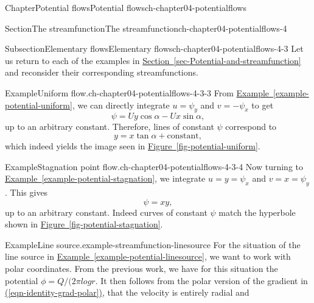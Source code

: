 \documentclass[oneside,10pt,]{book}
\newcommand{\xreffont}{\relax}
\numberwithin{equation}{section}
\begin{document}
\begin{chapterptx}{Chapter}{Potential flows}{}{Potential flows}{}{}{ch-chapter04-potentialflows}
\begin{sectionptx}{Section}{The streamfunction}{}{The streamfunction}{}{}{ch-chapter04-potentialflows-4}
%
%
\typeout{************************************************}
\typeout{************************************************}
%
\begin{subsectionptx}{Subsection}{Elementary flows}{}{Elementary flows}{}{}{ch-chapter04-potentialflows-4-3}
Let us return to each of the examples in \hyperref[sec-Potential-and-streamfunction]{Section~{\xreffont\ref{sec-Potential-and-streamfunction}}} and reconsider their corresponding streamfunctions.%
\begin{example}{Example}{Uniform flow.}{ch-chapter04-potentialflows-4-3-3}%
%
From \hyperref[example-potential-uniform]{Example~{\xreffont\ref{example-potential-uniform}}}, we can directly integrate \(u = \psi_y\) and \(v = -\psi_x\) to get%
\begin{equation*}
\psi = Uy\cos\alpha - Ux\sin\alpha, 
\end{equation*}
up to an arbitrary constant. Therefore, lines of constant \(\psi\) correspond to%
\begin{equation*}
y = x\tan\alpha + \textrm{constant},
\end{equation*}
which indeed yields the image seen in \hyperref[fig-potential-uniform]{Figure~{\xreffont\ref{fig-potential-uniform}}}.%
\end{example}
\begin{example}{Example}{Stagnation point flow.}{ch-chapter04-potentialflows-4-3-4}%
%
Now turning to \hyperref[example-potential-stagnation]{Example~{\xreffont\ref{example-potential-stagnation}}}, we integrate \(u = y = \psi_x\) and \(v = x = \psi_y\). This gives%
\begin{equation*}
\psi = xy, 
\end{equation*}
up to an arbitrary constant. Indeed curves of constant \(\psi\) match the hyperbole shown in \hyperref[fig-potential-stagnation]{Figure~{\xreffont\ref{fig-potential-stagnation}}}.%
\end{example}
\begin{example}{Example}{Line source.}{example-streamfunction-linesource}%
%
For the situation of the line source in \hyperref[example-potential-linesource]{Example~{\xreffont\ref{example-potential-linesource}}}, we want to work with polar coordinates. From the previous work, we have for this situation the potential \(\phi = Q/(2\pi log r\). It then follows from the polar version of the gradient in \hyperref[eqn-identity-grad-polar]{({\xreffont\ref{eqn-identity-grad-polar}})}, that the velocity is entirely radial and%

\end{example}
\end{subsectionptx}
\end{sectionptx}
\end{chapterptx}
\end{document}
